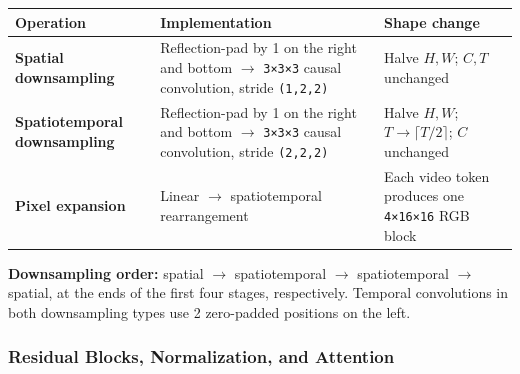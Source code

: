 \documentclass[
  11pt,
  a4paper,
]{article}
\newcounter{none} %
\begin{document}
{\def\LTcaptype{none} %
\begin{longtable}[]{@{}
  >{\raggedright\arraybackslash}p{}
  >{\raggedright\arraybackslash}p{}
  >{\raggedright\arraybackslash}p{}@{}}
\toprule\noalign{}
\begin{minipage}[b]{\linewidth}\raggedright
Operation
\end{minipage} & \begin{minipage}[b]{\linewidth}\raggedright
Implementation
\end{minipage} & \begin{minipage}[b]{\linewidth}\raggedright
Shape change
\end{minipage} \\
\midrule\noalign{}
\endhead
\bottomrule\noalign{}
\endlastfoot
\textbf{Spatial downsampling} & Reflection-pad by 1 on the right and
bottom \(\rightarrow\) \texttt{3×3×3} causal convolution, stride
\texttt{(1,2,2)} & Halve \(H,W\); \(C,T\) unchanged \\
\textbf{Spatiotemporal downsampling} & Reflection-pad by 1 on the right
and bottom \(\rightarrow\) \texttt{3×3×3} causal convolution, stride
\texttt{(2,2,2)} & Halve \(H,W\); \(T\to\lceil T/2\rceil\); \(C\)
unchanged \\
\textbf{Pixel expansion} & Linear \(\rightarrow\) spatiotemporal
rearrangement & Each video token produces one \texttt{4×16×16} RGB
block \\
\end{longtable}
}

\endgroup

\textbf{Downsampling order:} spatial \(\rightarrow\) spatiotemporal
\(\rightarrow\) spatiotemporal \(\rightarrow\) spatial, at the ends of
the first four stages, respectively. Temporal convolutions in both
downsampling types use 2 zero-padded positions on the left.


\subsubsection{Residual Blocks, Normalization, and
Attention}\label{residual-blocks-normalization-and-attention}
\end{document}
